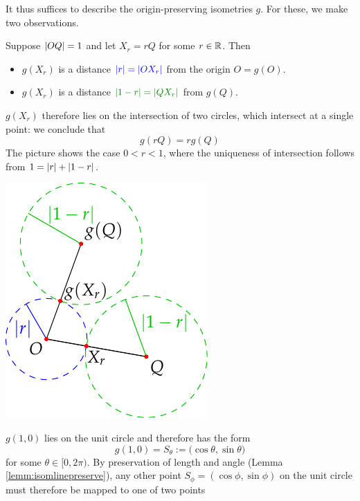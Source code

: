It thus suffices to describe the origin-preserving isometries $g$. For these, we make two observations.
\begin{enumerate}
	\begin{minipage}[t]{0.68\linewidth}\vspace{0pt}
	  \item\label{affinity} Suppose $\left| OQ\right|=1$ and let $X_r=rQ$ for some $r\in\mathbb{R}$. Then
	  \begin{itemize}
	    \item $g(X_r)$ is a distance $\textcolor{blue}{\left| r\right|=\left| OX_r\right|}$ from the origin $O=g(O)$.
	    \item $g(X_r)$ is a distance $\textcolor{Green}{\nm{1-r}=\nm{QX_r}}$ from $g(Q)$.
	  \end{itemize}
	  $g(X_r)$ therefore lies on the intersection of two circles, which intersect at a single point: we conclude that
	  \[
	  	g(rQ)=rg(Q)
	  \]
	  The picture shows the case $0<r<1$, where the uniqueness of intersection follows from
	  $1=\left| r\right|+\left| 1-r\right|$.
	\end{minipage}
	\hfill
	\begin{minipage}[t]{0.31\linewidth}\vspace{0pt}
		\flushright\includegraphics[scale=0.95]{isom-scale}
	\end{minipage}
	\bigbreak
	\begin{minipage}[t]{0.64\linewidth}\vspace{0pt}
		\item $g(1,0)$ lies on the unit circle and therefore has the form
		\[
			g(1,0)=S_\theta:=\bigl(\cos\theta,\sin\theta\bigr)
		\]
		for some $\theta\in[0,2\pi)$. By preservation of length and angle (Lemma \ref{lemm:isomlinepreserve}), any other point $S_\phi=(\cos\phi,\sin\phi)$ on the unit circle must therefore be mapped to one of two points

\end{minipage}
\end{enumerate}
